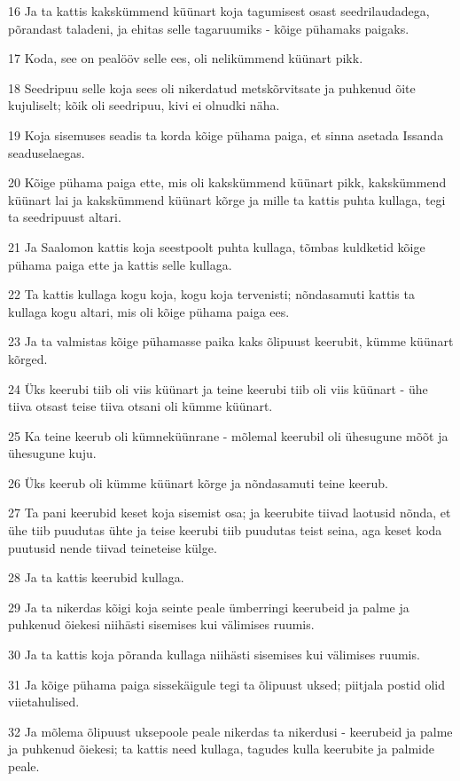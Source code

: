 \par 16 Ja ta kattis kakskümmend küünart koja tagumisest osast seedrilaudadega, põrandast taladeni, ja ehitas selle tagaruumiks - kõige pühamaks paigaks.
\par 17 Koda, see on pealööv selle ees, oli nelikümmend küünart pikk.
\par 18 Seedripuu selle koja sees oli nikerdatud metskõrvitsate ja puhkenud õite kujuliselt; kõik oli seedripuu, kivi ei olnudki näha.
\par 19 Koja sisemuses seadis ta korda kõige pühama paiga, et sinna asetada Issanda seaduselaegas.
\par 20 Kõige pühama paiga ette, mis oli kakskümmend küünart pikk, kakskümmend küünart lai ja kakskümmend küünart kõrge ja mille ta kattis puhta kullaga, tegi ta seedripuust altari.
\par 21 Ja Saalomon kattis koja seestpoolt puhta kullaga, tõmbas kuldketid kõige pühama paiga ette ja kattis selle kullaga.
\par 22 Ta kattis kullaga kogu koja, kogu koja tervenisti; nõndasamuti kattis ta kullaga kogu altari, mis oli kõige pühama paiga ees.
\par 23 Ja ta valmistas kõige pühamasse paika kaks õlipuust keerubit, kümme küünart kõrged.
\par 24 Üks keerubi tiib oli viis küünart ja teine keerubi tiib oli viis küünart - ühe tiiva otsast teise tiiva otsani oli kümme küünart.
\par 25 Ka teine keerub oli kümneküünrane - mõlemal keerubil oli ühesugune mõõt ja ühesugune kuju.
\par 26 Üks keerub oli kümme küünart kõrge ja nõndasamuti teine keerub.
\par 27 Ta pani keerubid keset koja sisemist osa; ja keerubite tiivad laotusid nõnda, et ühe tiib puudutas ühte ja teise keerubi tiib puudutas teist seina, aga keset koda puutusid nende tiivad teineteise külge.
\par 28 Ja ta kattis keerubid kullaga.
\par 29 Ja ta nikerdas kõigi koja seinte peale ümberringi keerubeid ja palme ja puhkenud õiekesi niihästi sisemises kui välimises ruumis.
\par 30 Ja ta kattis koja põranda kullaga niihästi sisemises kui välimises ruumis.
\par 31 Ja kõige pühama paiga sissekäigule tegi ta õlipuust uksed; piitjala postid olid viietahulised.
\par 32 Ja mõlema õlipuust uksepoole peale nikerdas ta nikerdusi - keerubeid ja palme ja puhkenud õiekesi; ta kattis need kullaga, tagudes kulla keerubite ja palmide peale.

